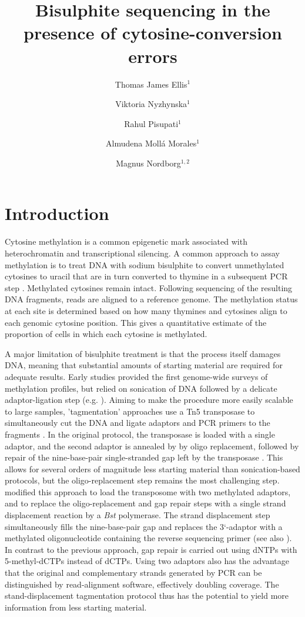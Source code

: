 \documentclass[twocolumn,twoside,lettersize]{article}
\title{Bisulphite sequencing in the presence of cytosine-conversion errors}
\author{
    Thomas James Ellis$^1$
    \and
    Viktoria Nyzhynska$^1$
    \and
    Rahul Pisupati$^1$
    \and
    Almudena Moll\'a Morales$^1$
    \and
    Magnus Nordborg$^{1,2}$
}
\date{
 \begin{list}{}{%
      \setlength{\leftmargin}{0cm}%
      \setlength{\rightmargin}{\leftmargin}}%
  \item\normalsize\bf 
    Bisulphite treatment of DNA converts unmethylated cytosines to thymine, and is a common method to infer the methylation status of cytosines when coupled with sequencing.
    'Tagmentation' approaches to bisulphite sequencing use a transposase to simultaneously make double-stranded breaks and ligate adaptors to the resulting fragments, allowing for higher throughput with less starting material.
    However, it has also been noted that certain tagmentation protocols have an unusually high number unmethylated cytosines that are not converted to thymine.
    Here we describe this phenomenon in detail, and find that results are consistent with single strand nicks by the transposase, followed by strand displacement of part or all of the DNA fragment, leading to erroneous incorporation of methylated cytosines.
    Nevertheless we show that these errors can be accounted for in downstream analysis and need not impede biological conclusions.
    We provide a Python package to allow users to implement this framework.
    Ultimately the additional effort of accounting for errors must be traded off against the scalability of the protocol in planning experiments.
  \end{list}
}
\begin{document}
\maketitle

\section{Introduction}

Cytosine methylation is a common epigenetic mark associated with heterochromatin and transcriptional silencing.
A common approach to assay methylation is to treat DNA with sodium bisulphite to convert unmethylated cytosines to uracil that are in turn converted to thymine in a subsequent PCR step \parencite{clark1994high}.
Methylated cytosines remain intact.
Following sequencing of the resulting DNA fragments, reads are aligned to a reference genome.
The methylation status at each site is determined based on how many thymines and cytosines align to each genomic cytosine position.
This gives a quantitative estimate of the proportion of cells in which each cytosine is methylated.

A major limitation of bisulphite treatment is that the process itself damages DNA, meaning that substantial amounts of starting material are required for adequate results.
Early studies provided the first genome-wide surveys of methylation profiles, but relied on sonication of DNA followed by a delicate adaptor-ligation step (e.g. \cite{meissner2005reduced, cokus2008shotgun, lister2009human}).
Aiming to make the procedure more easily scalable to large samples, 'tagmentation' approaches use a Tn5 transposase to simultaneously cut the DNA and ligate adaptors and PCR primers to the fragments \parencite{wang2013tagmentation}.
In the original protocol, the transposase is loaded with a single adaptor, and the second adaptor is annealed by by oligo replacement, followed by repair of the nine-base-pair single-stranded gap left by the transposase \parencite{adey2012ultra}.
This allows for several orders of magnitude less starting material than sonication-based protocols, but the oligo-replacement step remains the most challenging step.
\textcite{lu2015improved} modified this approach to load the transposome with two methylated adaptors, and to replace the oligo-replacement and gap repair steps with a single strand displacement reaction by a \textit{Bst} polymerase.
The strand displacement step simultaneously fills the nine-base-pair gap and replaces the 3`-adaptor with a methylated oligonucleotide containing the
reverse sequencing primer (see also \cite{weichenhan2019generation, suzuki2018whole}).
In contrast to the previous approach, gap repair is carried out using dNTPs with 5-methyl-dCTPs instead of dCTPs.
Using two adaptors also has the advantage that the original and complementary strands generated by PCR can be distinguished by read-alignment software, effectively doubling coverage. 
The stand-displacement tagmentation protocol thus has the potential to yield more information from less starting material.
\end{document}
